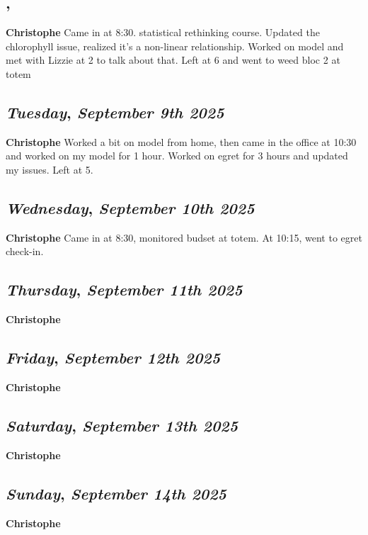 \subsection*{\weekday, \day}
\textbf {Christophe}
Came in at 8:30. statistical rethinking course. Updated the chlorophyll issue, realized it's a non-linear relationship. Worked on model and met with Lizzie at 2 to talk about that. Left at 6 and went to weed bloc 2 at totem

\def\day{\textit{September 9th 2025}}
\def\weekday{\textit{Tuesday}}
\subsection*{\weekday, \day}
\textbf {Christophe}
Worked a bit on model from home, then came in the office at 10:30 and worked on my model for 1 hour. Worked on egret for 3 hours and updated my issues. Left at 5.

\def\day{\textit{September 10th 2025}}
\def\weekday{\textit{Wednesday}}
\subsection*{\weekday, \day}
\textbf {Christophe}
Came in at 8:30, monitored budset at totem. At 10:15, went to egret check-in. 

\def\day{\textit{September 11th 2025}}
\def\weekday{\textit{Thursday}}
\subsection*{\weekday, \day}
\textbf {Christophe}

\def\day{\textit{September 12th 2025}}
\def\weekday{\textit{Friday}}
\subsection*{\weekday, \day}
\textbf {Christophe}

\def\day{\textit{September 13th 2025}}
\def\weekday{\textit{Saturday}}
\subsection*{\weekday, \day}
\textbf {Christophe}

\def\day{\textit{September 14th 2025}}
\def\weekday{\textit{Sunday}}
\subsection*{\weekday, \day}
\textbf {Christophe}

